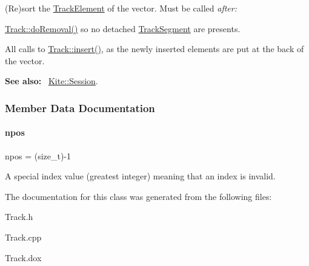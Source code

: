 (Re)sort the \hyperlink{classKite_1_1TrackElement}{Track\+Element} of the vector. Must be called {\itshape after\+:} 
\begin{DoxyItemize}
\item \hyperlink{classKite_1_1Track_abfffcd781865b94f62f27a1e7be99a38}{Track\+::do\+Removal()} so no detached \hyperlink{classKite_1_1TrackSegment}{Track\+Segment} are presents.
\item All calls to \hyperlink{classKite_1_1Track_aa392ba7cf1e3e485aac11cf326e31918}{Track\+::insert()}, as the newly inserted elements are put at the back of the vector.
\end{DoxyItemize}

{\bfseries See also\+:}~ \hyperlink{classKite_1_1Session}{Kite\+::\+Session}. 

\subsubsection{Member Data Documentation}
\mbox{\label{classKite_1_1Track_ae0070ea45b2592ce3701ab9e486e58a0}} 
\paragraph{\texorpdfstring{npos}{npos}}
{\footnotesize\ttfamily npos = (size\+\_\+t)-\/1\hspace{0.3cm}{\ttfamily [static]}}

A special index value (greatest integer) meaning that an index is invalid. 

The documentation for this class was generated from the following files\+:\begin{DoxyCompactItemize}
\item 
Track.\+h\item 
Track.\+cpp\item 
Track.\+dox\end{DoxyCompactItemize}
